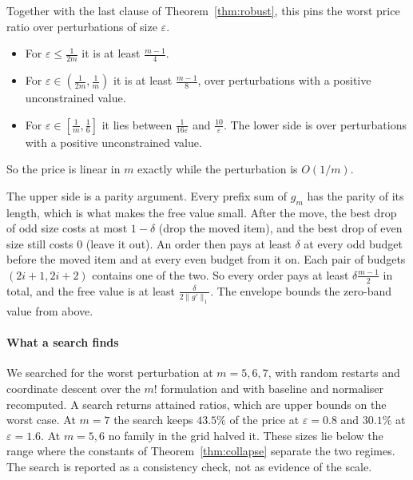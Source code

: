 
Together with the last clause of Theorem~\ref{thm:robust}, this pins the worst price ratio
over perturbations of size $\varepsilon$.
\begin{itemize}
\item For $\varepsilon\le\frac{1}{2m}$ it is at least $\frac{m-1}{4}$.
\item For $\varepsilon\in(\frac{1}{2m},\frac1m)$ it is at least $\frac{m-1}{8}$, over
perturbations with a positive unconstrained value.
\item For $\varepsilon\in[\frac1m,\frac16]$ it lies between $\frac{1}{16\varepsilon}$ and
$\frac{10}{\varepsilon}$. The lower side is over perturbations with a positive unconstrained
value.
\end{itemize}
So the price is linear in $m$ exactly while the perturbation is $O(1/m)$.

The upper side is a parity argument. Every prefix sum of $g_{m}$ has the parity of its
length, which is what makes the free value small. After the move, the best drop of odd size
costs at most $1-\delta$ (drop the moved item), and the best drop of even size still costs
$0$ (leave it out). An order then pays at least $\delta$ at every odd budget before the moved
item and at every even budget from it on. Each pair of budgets $(2i+1,2i+2)$ contains one of
the two. So every order pays at least $\delta\frac{m-1}{2}$ in total, and the free value is at
least $\frac{\delta}{2\|g'\|_{1}}$. The envelope bounds the zero-band value from above.

\paragraph{What a search finds}
We searched for the worst perturbation at $m=5,6,7$, with random restarts and coordinate
descent over the $m!$ formulation and with baseline and normaliser recomputed. A search returns
attained ratios, which are upper bounds on the worst case. At $m=7$ the search keeps $43.5\%$
of the price at $\varepsilon=0.8$ and $30.1\%$ at $\varepsilon=1.6$. At $m=5,6$ no family in
the grid halved it. \NUM{} These sizes lie below the range where the constants of
Theorem~\ref{thm:collapse} separate the two regimes. The search is reported as a consistency
check, not as evidence of the scale.

